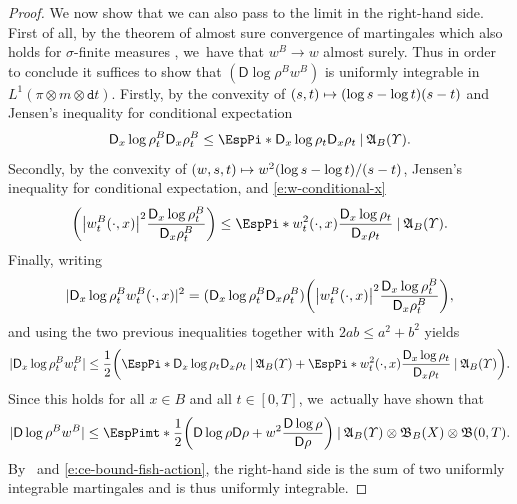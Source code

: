 \documentclass[JEP,XML,SOM,Unicode,published]{cedram}
\newcommand\mto{\mathchoice{\longmapsto}{\mapsto}{\mapsto}{\mapsto}}
\theoremstyle{definition}
\theoremstyle{remark}
\DeclarePairedDelimiter{\paren}{\lparen}{\rparen}
\DeclarePairedDelimiter{\abs}{\lvert}{\rvert}
\newcommand{\given}[1][]{%
\nonscript\:#1\vert
\allowbreak
\nonscript\:
\mathopen{}}
\begin{document}
\begin{proof}
We now show that we can also pass to the limit in the right-hand side.
First of all, by the theorem of almost sure convergence of martingales which also holds for $\sigma$-finite measures \cite[\S 41, p.\,37]{DellacherieMeyerMartingales}, we~have that $w^{B} \to w$ almost surely.
Thus in order to conclude it suffices to show that $(\mathsf{D} \log \rho^{B} w^{B})$ is uniformly integrable in $L^{1}(\pi \otimes m \otimes \mathtt{d} t)$.
Firstly, by the convexity of $(s, t) \mto (\log s - \log t)(s -t)$ and Jensen's inequality for conditional expectation
\begin{equation*}
\mathsf{D}_{x} \log \rho^{B}_{t} \mathsf{D}_{x} \rho^{B}_{t} \leq \EspPi*{ \mathsf{D}_{x} \log \rho_{t} \mathsf{D}_{x} \rho_{t} \given \mathfrak{A}_{B}(\varUpsilon)}.
\end{equation*}
Secondly, by the convexity of $(w, s, t) \mto w^{2} (\log s - \log t) / (s -t)$, Jensen's inequality for conditional expectation, and \cref{e:w-conditional-x}
\begin{equation*}
\paren*{ \abs*{w_{t}^{B}(\cdot, x)}^{2} \frac{\mathsf{D}_{x} \log \rho^{B}_{t}}{\mathsf{D}_{x} \rho^{B}_{t}} } \leq \EspPi*{ w_{t}^{2}(\cdot, x) \frac{\mathsf{D}_{x} \log \rho_{t}}{\mathsf{D}_{x} \rho_{t}} \given \mathfrak{A}_{B}(\varUpsilon) }.
\end{equation*}
Finally, writing
\begin{equation*}
\abs{ \mathsf{D}_{x} \log \rho_{t}^{B} w^{B}_{t}(\cdot, x) }^{2} = \paren{ \mathsf{D}_{x} \log \rho^{B}_{t} \mathsf{D}_{x} \rho_{t}^{B} } \paren*{ \abs*{w_{t}^{B}(\cdot, x)}^{2} \frac{\mathsf{D}_{x} \log \rho^{B}_{t}}{\mathsf{D}_{x} \rho^{B}_{t}} },
\end{equation*}
and using the two previous inequalities together with $2ab \leq a^{2} + b^{2}$ yields
\begin{equation*}
\abs{ \mathsf{D}_{x} \log \rho^{B}_{t} w^{B}_{t} } \leq \frac{1}{2} \paren*{ \EspPi*{ \mathsf{D}_{x} \log \rho_{t} \mathsf{D}_{x} \rho_{t} \given \mathfrak{A}_{B}(\varUpsilon) } + \EspPi*{ w_{t}^{2}(\cdot, x) \frac{\mathsf{D}_{x} \log \rho_{t}}{\mathsf{D}_{x} \rho_{t}} \given \mathfrak{A}_{B}(\varUpsilon) } }.
\end{equation*}
Since this holds for all $x \in B$ and all $t \in [0,T]$, we~actually have shown that
\begin{equation*}
\abs{ \mathsf{D} \log \rho^{B} w^{B} } \leq \EspPimt*{ \frac{1}{2} \paren*{ \mathsf{D} \log \rho \mathsf{D} \rho + w^{2} \frac{\mathsf{D} \log \rho}{\mathsf{D} \rho} } \given \mathfrak{A}_{B}(\varUpsilon) \otimes \mathfrak{B}_{B}(X) \otimes \mathfrak{B}(0,T) }.
\end{equation*}
By~\cite[Th.\,41.1, p.\,38]{DellacherieMeyerMartingales} and \cref{e:ce-bound-fish-action}, the right-hand side is the sum of two uniformly integrable martingales and is thus uniformly integrable.
\end{proof}
\end{document}
